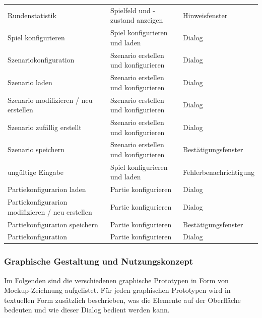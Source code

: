 \documentclass[12pt]{article}
\begin{document}
\begin{tabularx}{16cm}{p{4cm}|p{7cm}|l}
	Rundenstatistik & Spielfeld und -zustand anzeigen & Hinweisfenster \\ 
	Spiel konfigurieren & Spiel konfigurieren und laden & Dialog \\ 
	Szenariokonfiguration & Szenario erstellen und konfigurieren & Dialog \\ 
	Szenario laden & Szenario erstellen und konfigurieren & Dialog \\
	Szenario modifizieren / neu erstellen & Szenario erstellen und konfigurieren & Dialog \\
	Szenario zufällig erstellt & Szenario erstellen und konfigurieren & Dialog \\
	Szenario speichern & Szenario erstellen und konfigurieren & Bestätigungsfenster \\
	ungültige Eingabe & Spiel konfigurieren und laden & Fehlerbenachrichtigung \\
	Partiekonfigurarion laden & Partie konfigurieren & Dialog \\
	Partiekonfigurarion modifizieren / neu erstellen & Partie konfigurieren & Dialog \\
	Partiekonfigurarion speichern & Partie konfigurieren & Bestätigungsfenster \\
	Partiekonfiguration & Partie konfigurieren & Dialog 
\end{tabularx}

\subsubsection{Graphische Gestaltung und Nutzungskonzept}
Im Folgenden sind die verschiedenen graphische Prototypen in Form von \glqq{}Mockup\grqq{}-Zeichnung aufgelistet. Für jeden graphischen Prototypen wird in textuellen Form zusätzlich beschrieben, was die Elemente auf der Oberfläche bedeuten und wie dieser Dialog bedient werden kann. 
\end{document}
